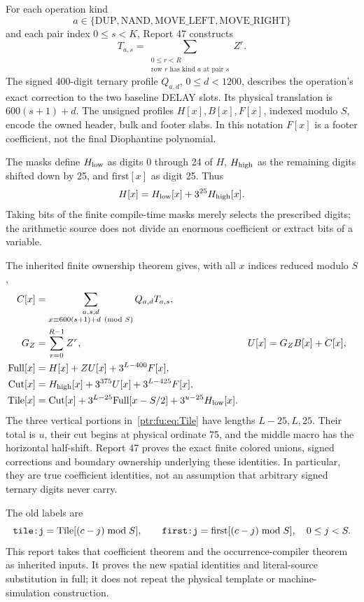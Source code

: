 \documentclass[11pt,letterpaper]{article}
\theoremstyle{definition}\newtheorem{definition}[theorem]{Definition}
\theoremstyle{remark}\newtheorem{remark}[theorem]{Remark}
\newcommand{\op}[1]{\mathrm{#1}}
\newcommand{\code}[1]{\texttt{\detokenize{#1}}}
\begin{document}
For each operation kind
\[
 a\in\{\op{DUP},\op{NAND},\op{MOVE\_LEFT},\op{MOVE\_RIGHT}\}
\]
and each pair index $0\le s<K$, Report 47 constructs
\[
 T_{a,s}=\sum_{\substack{0\le r<R\\\text{row }r\text{ has kind }a\text{ at pair }s}}Z^r.
\]
The signed 400-digit ternary profile $Q_{a,d}$, $0\le d<1200$, describes the operation's exact correction to the two baseline DELAY slots. Its physical translation is $600(s+1)+d$. The unsigned profiles $H[x],B[x],F[x]$, indexed modulo $S$, encode the owned header, bulk and footer slabs. In this notation $F[x]$ is a footer coefficient, not the final Diophantine polynomial.

The masks define $H_{\rm low}$ as digits 0 through 24 of $H$, $H_{\rm high}$ as the remaining digits shifted down by 25, and $\op{first}[x]$ as digit 25. Thus
\[
 H[x]=H_{\rm low}[x]+3^{25}H_{\rm high}[x].
\]
Taking bits of the finite compile-time masks merely selects the prescribed digits; the arithmetic source does not divide an enormous coefficient or extract bits of a variable.

The inherited finite ownership theorem gives, with all $x$ indices reduced modulo $S$,
\begin{align}
 C[x]&=\sum_{\substack{a,s,d\\x\equiv600(s+1)+d\pmod S}} Q_{a,d}T_{a,s},\label{ptr:fu:eq:C}\\
 G_Z&=\sum_{r=0}^{R-1}Z^r,& U[x]&=G_Z B[x]+C[x],\label{ptr:fu:eq:U}\\
 \op{Full}[x]&=H[x]+ZU[x]+3^{L-400}F[x],\label{ptr:fu:eq:Full}\\
 \op{Cut}[x]&=H_{\rm high}[x]+3^{375}U[x]+3^{L-425}F[x],\label{ptr:fu:eq:Cut}\\
 \op{Tile}[x]&=\op{Cut}[x]+3^{L-25}\op{Full}[x-S/2]
                 +3^{u-25}H_{\rm low}[x].\label{ptr:fu:eq:Tile}
\end{align}
The three vertical portions in~\eqref{ptr:fu:eq:Tile} have lengths $L-25,L,25$. Their total is $u$, their cut begins at physical ordinate 75, and the middle macro has the horizontal half-shift. Report 47 proves the exact finite colored unions, signed corrections and boundary ownership underlying these identities. In particular, they are true coefficient identities, not an assumption that arbitrary signed ternary digits never carry.

The old labels are
\begin{equation}\label{ptr:fu:eq:labels}
 \code{tile:j}=\op{Tile}[(c-j)\bmod S],\qquad
 \code{first:j}=\op{first}[(c-j)\bmod S],\quad 0\le j<S.
\end{equation}
This report takes that coefficient theorem and the occurrence-compiler theorem as inherited inputs. It proves the new spatial identities and literal-source substitution in full; it does not repeat the physical template or machine-simulation construction.
\end{document}

